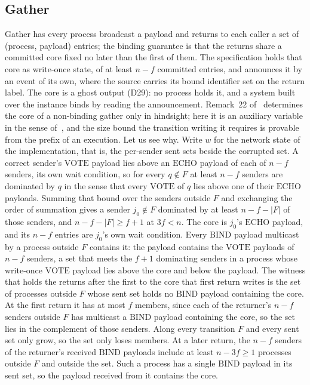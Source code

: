 \subsection{Gather}


Gather has every process broadcast a payload and returns to each caller a set of (process, payload) entries; the binding guarantee is that the returns share a committed core fixed no later than the first of them.
The specification holds that core as write-once state, of at least $n - f$ committed entries, and announces it by an event of its own, where the source carries its bound identifier set on the return label.
The core is a ghost output (D29): no process holds it, and a system built over the instance binds by reading the announcement.
Remark~22 of~\cite{AFW25} determines the core of a non-binding gather only in hindsight; here it is an auxiliary variable in the sense of~\cite{AL91}, and the size bound the transition writing it requires is provable from the prefix of an execution.
Let us see why.
Write $w$ for the network state of the implementation, that is, the per-sender sent sets beside the corrupted set.
A correct sender's $\mathrm{VOTE}$ payload lies above an $\mathrm{ECHO}$ payload of each of $n - f$ senders, its own wait condition, so for every $q \notin F$ at least $n - f$ senders are dominated by $q$ in the sense that every $\mathrm{VOTE}$ of $q$ lies above one of their $\mathrm{ECHO}$ payloads.
Summing that bound over the senders outside $F$ and exchanging the order of summation gives a sender $j_0 \notin F$ dominated by at least $n - f - |F|$ of those senders, and $n - f - |F| \ge f + 1$ at $3f < n$.
The core is $j_0$'s $\mathrm{ECHO}$ payload, and its $n - f$ entries are $j_0$'s own wait condition.
Every $\mathrm{BIND}$ payload multicast by a process outside $F$ contains it: the payload contains the $\mathrm{VOTE}$ payloads of $n - f$ senders, a set that meets the $f{+}1$ dominating senders in a process whose write-once $\mathrm{VOTE}$ payload lies above the core and below the payload.
The witness that holds the returns after the first to the core that first return writes is the set of processes outside $F$ whose sent set holds no $\mathrm{BIND}$ payload containing the core.
At the first return it has at most $f$ members, since each of the returner's $n - f$ senders outside $F$ has multicast a $\mathrm{BIND}$ payload containing the core, so the set lies in the complement of those senders.
Along every transition $F$ and every sent set only grow, so the set only loses members.
At a later return, the $n - f$ senders of the returner's received $\mathrm{BIND}$ payloads include at least $n - 3f \ge 1$ processes outside $F$ and outside the set.
Such a process has a single $\mathrm{BIND}$ payload in its sent set, so the payload received from it contains the core.

